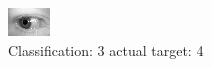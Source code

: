 \begin{figure}[h!]
\begin{center}
\includegraphics[width=0.60\columnwidth]{figures/ID687_class_3_target_4.png}
\end{center}
\caption{ Classification: 3 actual target: 4}
\label{fig:ID687_class_3_target_4}
\end{figure}
